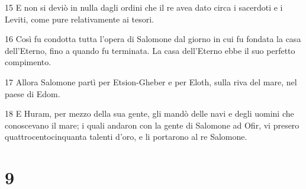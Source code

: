 \par 15 E non si deviò in nulla dagli ordini che il re avea dato circa i sacerdoti e i Leviti, come pure relativamente ai tesori.
\par 16 Così fu condotta tutta l'opera di Salomone dal giorno in cui fu fondata la casa dell'Eterno, fino a quando fu terminata. La casa dell'Eterno ebbe il suo perfetto compimento.
\par 17 Allora Salomone partì per Etsion-Gheber e per Eloth, sulla riva del mare, nel paese di Edom.
\par 18 E Huram, per mezzo della sua gente, gli mandò delle navi e degli uomini che conoscevano il mare; i quali andaron con la gente di Salomone ad Ofir, vi presero quattrocentocinquanta talenti d'oro, e li portarono al re Salomone.

\chapter{9}

